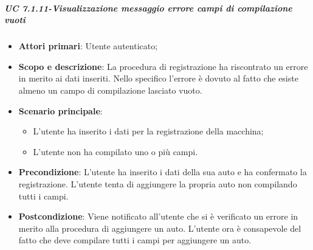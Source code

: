                  
                 
            \subparagraph{UC 7.1.11-Visualizzazione messaggio errore campi di compilazione vuoti}
    \begin{itemize}
                \item \textbf{Attori primari}: Utente autenticato;
               
                 \item \textbf{Scopo e descrizione}: La procedura di registrazione ha riscontrato un errore in merito ai
                dati inseriti. Nello specifico l'errore è dovuto al fatto che esiste almeno un campo di compilazione lasciato vuoto.
                 \item \textbf{Scenario principale}: 
                 \begin{itemize}
                     \item L'utente ha inserito i dati per la registrazione della macchina;
                     \item L'utente non ha compilato uno o più campi.
                 \end{itemize}
                 \item \textbf{Precondizione}: L'utente ha inserito i dati della sua auto e ha confermato la registrazione. L'utente tenta di aggiungere la propria auto non compilando tutti i campi.
                 \item \textbf{Postcondizione}: Viene notificato all'utente che si è verificato un errore in merito alla procedura di aggiungere un auto. L'utente ora è consapevole del fatto che deve compilare tutti i campi per aggiungere un auto.
                 \end{itemize}
                 
